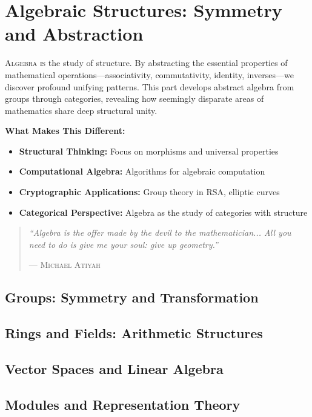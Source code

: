\part{Algebraic Structures: Symmetry and Abstraction}
\label{part:algebra}

\begin{partintro}
\lettrine[lines=3]{A}{lgebra is} the study of structure. By abstracting the essential properties of mathematical operations—associativity, commutativity, identity, inverses—we discover profound unifying patterns. This part develops abstract algebra from groups through categories, revealing how seemingly disparate areas of mathematics share deep structural unity.

\vspace{1em}
\textbf{What Makes This Different:}
\begin{itemize}[noitemsep]
    \item \textbf{Structural Thinking:} Focus on morphisms and universal properties
    \item \textbf{Computational Algebra:} Algorithms for algebraic computation
    \item \textbf{Cryptographic Applications:} Group theory in RSA, elliptic curves
    \item \textbf{Categorical Perspective:} Algebra as the study of categories with structure
\end{itemize}

\begin{quote}
\textit{``Algebra is the offer made by the devil to the mathematician... All you need to do is give me your soul: give up geometry.''}

\hfill--- \textsc{Michael Atiyah}
\end{quote}
\end{partintro}

\chapter{Groups: Symmetry and Transformation}
\chapter{Rings and Fields: Arithmetic Structures}
\chapter{Vector Spaces and Linear Algebra}
\chapter{Modules and Representation Theory}
